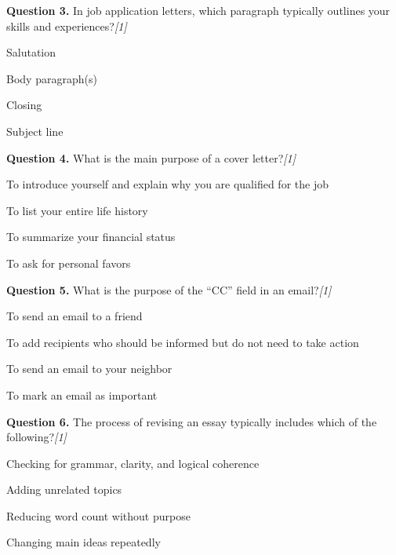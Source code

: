 \documentclass[11pt,a4paper]{article}
\newcommand{\pts}[1]{\hfill   \textit{[#1]}}
\begin{document}
\noindent   \textbf{Question 3.} In job application letters, which paragraph typically outlines your skills and experiences?\pts{1}

\begin{parts}
  \item Salutation
  \item Body paragraph(s)
  \item Closing
  \item Subject line
\end{parts}

\medskip




\noindent   \textbf{Question 4.} What is the main purpose of a cover letter?\pts{1}

\begin{parts}
  \item To introduce yourself and explain why you are qualified for the job
  \item To list your entire life history
  \item To summarize your financial status
  \item To ask for personal favors
\end{parts}

\medskip




\noindent   \textbf{Question 5.} What is the purpose of the ``CC'' field in an email?\pts{1}

\begin{parts}
  \item To send an email to a friend
  \item To add recipients who should be informed but do not need to take action
  \item To send an email to your neighbor
  \item To mark an email as important
\end{parts}

\medskip




\noindent   \textbf{Question 6.} The process of revising an essay typically includes which of the following?\pts{1}

\begin{parts}
  \item Checking for grammar, clarity, and logical coherence
  \item Adding unrelated topics
  \item Reducing word count without purpose
  \item Changing main ideas repeatedly
\end{parts}
\end{document}

